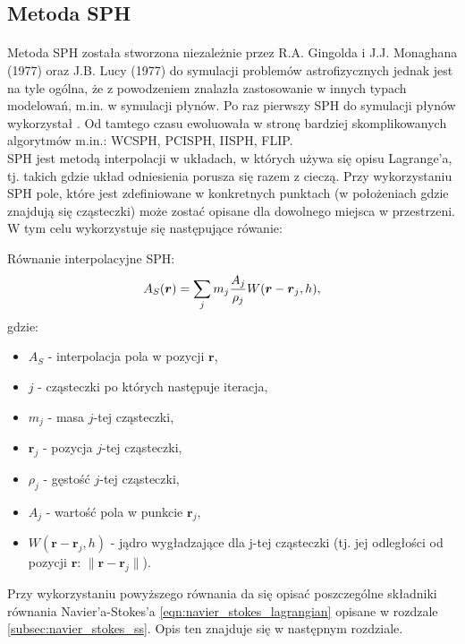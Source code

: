 \subsection{Metoda SPH}
\paragraph{}
Metoda SPH została stworzona niezależnie przez R.A. Gingolda i J.J. Monaghana (1977) oraz J.B. Lucy (1977) do symulacji problemów astrofizycznych jednak jest na tyle ogólna, że z powodzeniem znalazła zastosowanie w innych typach modelowań, m.in. w symulacji płynów. Po raz pierwszy SPH do symulacji płynów wykorzystał \cite{muller03}. Od tamtego czasu ewoluowała w stronę bardziej skomplikowanych algorytmów m.in.: WCSPH, PCISPH, IISPH, FLIP.\\
SPH jest metodą interpolacji w układach, w których używa się opisu Lagrange'a, tj. takich gdzie układ odniesienia porusza się razem z cieczą. Przy wykorzystaniu SPH pole, które jest zdefiniowane w konkretnych punktach (w położeniach gdzie znajdują się cząsteczki) może zostać opisane dla dowolnego miejsca w przestrzeni. W tym celu wykorzystuje się następujące rówanie:\\

\begin{samepage}
{\sc Równanie interpolacyjne SPH: }
\begin{equation}
A_S(\boldsymbol{r}) = \sum\limits_{j} m_j {A_j \over\rho_j}W(\boldsymbol{r}-\boldsymbol{r}_j, h),
\label{eqn:sph}
\end{equation}
gdzie:

\begin{itemize}[noitemsep,topsep=0pt,parsep=0pt,partopsep=0pt]
\renewcommand\labelitemi{--}
\item $ A_S $ - interpolacja pola w pozycji $\boldsymbol{r}$,
\item $j$ - cząsteczki po których następuje iteracja,
\item $m_j$ - masa $j$-tej cząsteczki,
\item $\boldsymbol{r}_j$ - pozycja $j$-tej cząsteczki,
\item $\rho_j$ - gęstość $j$-tej cząsteczki,
\item $A_j$ - wartość pola w punkcie $\boldsymbol{r}_j$,
\item $W(\boldsymbol{r}-\boldsymbol{r}_j, h)$ - jądro wygładzające dla j-tej cząsteczki (tj. jej odległości od pozycji $\boldsymbol{r}$: $\| \boldsymbol{r}-\boldsymbol{r}_j \|$).
\end{itemize}
\end{samepage}
\vspace{3ex}
Przy wykorzystaniu powyższego równania da się opisać poszczególne składniki równania Navier'a-Stokes'a \eqref{eqn:navier_stokes_lagrangian} opisane w rozdzale \eqref{subsec:navier_stokes_ss}. Opis ten znajduje się w następnym rozdziale.
\par


